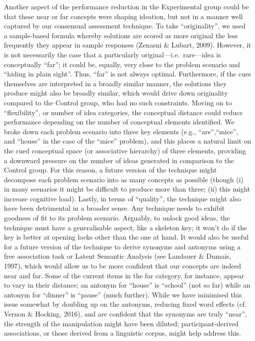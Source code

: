 \documentclass[english,man]{apa6}
\begin{document}
Another aspect of the performance reduction in the Experimental group
could be that these near or far concepts were shaping ideation, but not
in a manner well captured by our consensual assessment technique. To
take \enquote{originality}, we used a sample-based formula whereby
solutions are scored as more original the less frequently they appear in
sample responses (Zenasni \& Lubart, 2009). However, it is not
necessarily the case that a particularly original---i.e.~rare---idea is
conceptually \enquote{far}; it could be, equally, very close to the
problem scenario and \enquote{hiding in plain sight}. Thus,
\enquote{far} is not always optimal. Furthermore, if the cues themselves
are interpreted in a broadly similar manner, the solutions they produce
might also be broadly similar, which would drive down originality
compared to the Control group, who had no such constraints. Moving on to
\enquote{flexibility}, or number of idea categories, the conceptual
distance could reduce performance depending on the number of conceptual
elements identified. We broke down each problem scenario into three key
elements (e.g., \enquote{are},\enquote{mice}, and \enquote{house} in the
case of the \enquote{mice} problem), and this places a natural limit on
the cued conceptual space (or associative hierarchy) of three elements,
providing a downward pressure on the number of ideas generated in
comparison to the Control group. For this reason, a future version of
the technique might decompose each problem scenario into as many
concepts as possible (though (i) in many scenarios it might be difficult
to produce more than three; (ii) this might increase cognitive load).
Lastly, in terms of \enquote{quality}, the technique might also have
been detrimental in a broader sense. Any technique needs to exhibit
goodness of fit to its problem scenario. Arguably, to unlock good ideas,
the technique must have a generalisable aspect, like a skeleton key; it
won't do if the key is better at opening locks other than the one at
hand. It would also be useful for a future version of the technique to
derive synonyms and antonyms using a free association task or Latent
Semantic Analysis (see Landauer \& Dumais, 1997), which would allow us
to be more confident that our concepts are indeed near and far. Some of
the current items in the far category, for instance, appear to vary in
their distance; an antonym for \enquote{house} is \enquote{school} (not
so far) while an antonym for \enquote{dinner} is \enquote{pause} (much
further). While we have minimised this issue somewhat by doubling up on
the antonyms, reducing fixed word effects (cf. Vernon \& Hocking, 2016),
and are confident that the synonyms are truly \enquote{near}, the
strength of the manipulation might have been diluted;
participant-derived associations, or those derived from a linguistic
corpus, might help address this.
\end{document}
